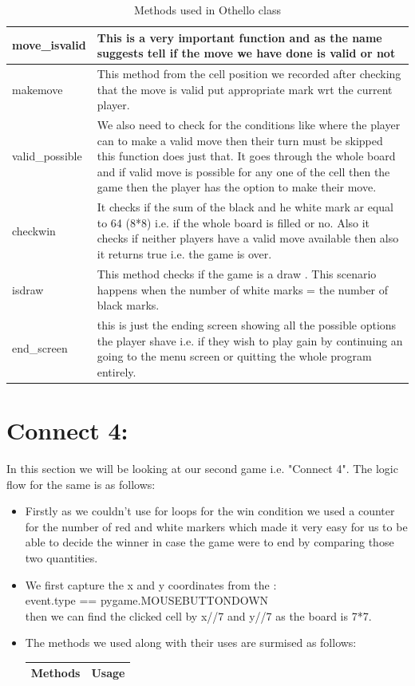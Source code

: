 \documentclass{article}
\begin{document}
\begin{itemize}[leftmargin=1.5em, topsep=0pt, itemsep=0pt]
\begin{table}[H]
\begin{tabular}{|p{4cm}|p{9cm}|}
move\_isvalid
 & This is a very important function and as the name suggests tell if the move we have done is valid or not \\
\hline
makemove
 & This method from the cell position we recorded after checking that the move is valid put appropriate mark wrt the current player.\\
\hline
valid\_possible
 & We also need to check for the conditions like where the player can to make a valid move then their turn must be skipped this function does just that. It goes through the whole board and if valid move is possible for any one of the cell then the game then the player has the option to make their move.\\
\hline
checkwin
 & It checks if the sum of the black and he white mark ar equal to 64 (8*8) i.e. if the whole board is filled or no. Also it checks if neither players have a valid move available then also it returns true i.e. the game is over.  \\
\hline
isdraw
 &This method checks if the game is a draw . This scenario happens when the number of white marks = the number of black marks.\\
\hline
end\_screen
 & this is just the ending screen showing all the possible options the player shave i.e. if they wish to play gain by continuing an going to the menu screen or quitting the whole program entirely.\\
\hline
\end{tabular}
\caption{Methods used in Othello class}
\end{table}
\newpage 
\section*{Connect 4:}
In this section we will be looking at our second game i.e. "Connect 4". The logic flow for the same is as follows:\\

\begin{itemize}[leftmargin=1.5em, topsep=0pt, itemsep=0pt]
    \item Firstly as we couldn't use for loops for the win condition we used a counter for the number of red and white markers which made it very easy for us to be able to decide the winner in case the game were to end by comparing those two quantities.\\
    
    \item We first capture the x and y coordinates from the :  \\
    event.type == pygame.MOUSEBUTTONDOWN 
    \\then we can find the clicked cell by x//7 and y//7 as the board is 7*7.\\
    \item  The methods we used along with their uses are surmised as follows:
        \begin{table}[H]
\centering
\begin{tabular}{|p{4cm}|p{9cm}|}
\hline
\textbf{Methods} & \textbf{Usage} \\ 
\hline


\end{tabular}
\end{table}
\end{itemize}
\end{itemize}
\end{document}
